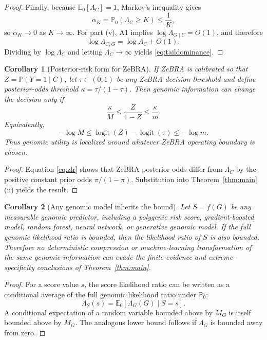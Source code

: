 \documentclass[journal]{IEEEtran}
\newtheorem{corollary}{Corollary}
\newcommand{\Pzero}{\mathbb{P}_0}
\newcommand{\Ezero}{\mathbb{E}_0}
\newcommand{\LR}{\Lambda}
\begin{document}
\begin{proof}
Finally, because $\Ezero[\LR_C]=1$, Markov's inequality gives
\begin{equation}
\alpha_K=\Pzero(\LR_C\ge K)\le\frac{1}{K},
\end{equation}
so $\alpha_K\to0$ as $K\to\infty$. For part (v), A1 implies $\log\LR_{G\mid C}=O(1)$, and therefore
\begin{equation}
\log\LR_{C,G}=\log\LR_C+O(1).
\end{equation}
Dividing by $\log\LR_C$ and letting $\LR_C\to\infty$ yields \eqref{eq:taildominance}.
\end{proof}

\begin{corollary}[Posterior-risk form for ZeBRA]
\label{cor:zebra}
If ZeBRA is calibrated so that $Z=\mathbb{P}(Y=1\mid C)$, let $\tau\in(0,1)$ be any ZeBRA decision threshold and define posterior-odds threshold $\kappa=\tau/(1-\tau)$. Then genomic information can change the decision only if
\begin{equation}
\boxed{
\frac{\kappa}{M}
\le
\frac{Z}{1-Z}
\le
\frac{\kappa}{m}.
}
\label{eq:zboundary}
\end{equation}
Equivalently,
\begin{equation}
-\log M
\le
\operatorname{logit}(Z)-\operatorname{logit}(\tau)
\le
-\log m.
\end{equation}
Thus genomic utility is localized around \emph{whatever} ZeBRA operating boundary is chosen.
\end{corollary}

\begin{proof}
Equation \eqref{eq:zlr} shows that ZeBRA posterior odds differ from $\LR_C$ by the positive constant prior odds $\pi/(1-\pi)$. Substitution into Theorem~\ref{thm:main}(ii) yields the result.
\end{proof}

\begin{corollary}[Any genomic model inherits the bound]
Let $S=f(G)$ be any measurable genomic predictor, including a polygenic risk score, gradient-boosted model, random forest, neural network, or generative genomic model. If the full genomic likelihood ratio is bounded, then the likelihood ratio of $S$ is also bounded. Therefore no deterministic compression or machine-learning transformation of the same genomic information can evade the finite-evidence and extreme-specificity conclusions of Theorem~\ref{thm:main}.
\end{corollary}

\begin{proof}
For a score value $s$, the score likelihood ratio can be written as a conditional average of the full genomic likelihood ratio under $\Pzero$:
\begin{equation}
\LR_S(s)=\mathbb{E}_0[\LR_G(G)\mid S=s].
\end{equation}
A conditional expectation of a random variable bounded above by $M_G$ is itself bounded above by $M_G$. The analogous lower bound follows if $\LR_G$ is bounded away from zero.
\end{proof}
\end{document}
